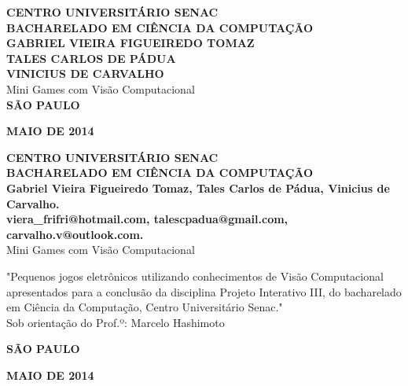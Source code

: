 \documentclass[a4paper]{article}
\begin{document}
\begin{titlepage}
 \vfill
  \begin{center}
   {\large \textbf{CENTRO UNIVERSITÁRIO SENAC}} \\
   {\large \textbf{BACHARELADO EM CIÊNCIA DA COMPUTAÇÃO}} \\[4cm]
   
   {\large \textbf{GABRIEL VIEIRA FIGUEIREDO TOMAZ}}\\
   {\large \textbf{TALES CARLOS DE PÁDUA}}\\
   {\large \textbf{VINICIUS DE CARVALHO}}\\[4cm]


   {\Large Mini Games com Visão Computacional}\\[4cm]

\vspace{2cm}
\large \textbf{SÃO PAULO}

\large \textbf{MAIO DE 2014}
\end{center}
\end{titlepage}

\break

\begin{titlepage}
 \vfill
  \begin{center}
   {\large \textbf{CENTRO UNIVERSITÁRIO SENAC}} \\
   {\large \textbf{BACHARELADO EM CIÊNCIA DA COMPUTAÇÃO}} \\[4cm]

   {\large \textbf{Gabriel Vieira Figueiredo Tomaz, Tales Carlos de Pádua, Vinicius de Carvalho.}}\\ [1cm]
  
   {\large \textbf{viera\_frifri@hotmail.com, talescpadua@gmail.com, carvalho.v@outlook.com.}}\\ [3cm]
   
 
   {\Large Mini Games com Visão Computacional}\\[2cm]

   \hspace{.45\textwidth} 
   \begin{minipage}{.5\textwidth}
   \large "Pequenos jogos eletrônicos utilizando conhecimentos de Visão Computacional apresentados para a conclusão da disciplina Projeto Interativo III, do bacharelado em Ciência da Computação, Centro Universitário Senac."\\[0.5cm]
			Sob orientação do Prof.º: Marcelo Hashimoto
  \end{minipage}
  \vfill

\vspace{1cm}
\large \textbf{SÃO PAULO}

\large \textbf{MAIO DE 2014}
\end{center}
\end{titlepage}
\end{document}
